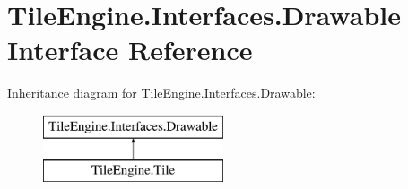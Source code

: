 \hypertarget{interface_tile_engine_1_1_interfaces_1_1_drawable}{\section{Tile\-Engine.\-Interfaces.\-Drawable Interface Reference}
\label{df/d03/interface_tile_engine_1_1_interfaces_1_1_drawable}
}
Inheritance diagram for Tile\-Engine.\-Interfaces.\-Drawable\-:\begin{figure}[H]
\begin{center}
\leavevmode
\includegraphics[height=2.000000cm]{df/d03/interface_tile_engine_1_1_interfaces_1_1_drawable}
\end{center}
\end{figure}
